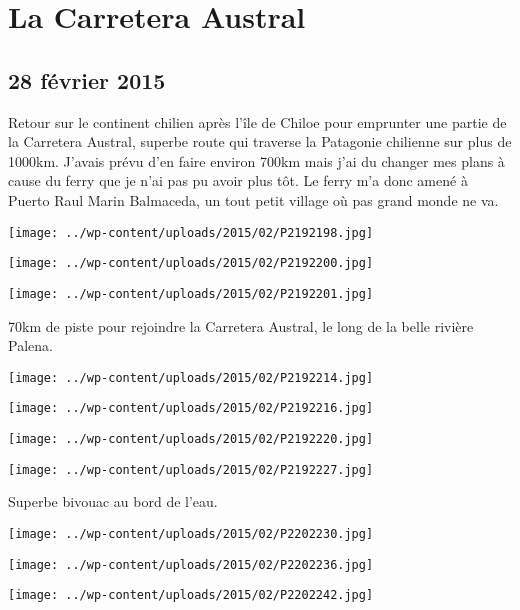 \chapter{La Carretera Austral}
\section*{28 février 2015}
Retour sur le continent chilien après l'île de Chiloe pour emprunter une partie de la Carretera Austral, superbe route qui traverse la Patagonie chilienne sur plus de 1000km. \newline
 J'avais prévu d'en faire environ 700km mais j'ai du changer mes plans à cause du ferry que je n'ai pas pu avoir plus tôt. \newline
 Le ferry m'a donc amené à Puerto Raul Marin Balmaceda, un tout petit village où pas grand monde ne va. \newline
 \newline
\centerline{\texttt{[image: ../wp-content/uploads/2015/02/P2192198.jpg]} } 
\newline
\centerline{\texttt{[image: ../wp-content/uploads/2015/02/P2192200.jpg]} } 
 \newline
\centerline{\texttt{[image: ../wp-content/uploads/2015/02/P2192201.jpg]} } 
70km de piste pour rejoindre la Carretera Austral, le long de la belle rivière Palena. \newline
 \newline
\centerline{\texttt{[image: ../wp-content/uploads/2015/02/P2192214.jpg]} } 
 \newline
\centerline{\texttt{[image: ../wp-content/uploads/2015/02/P2192216.jpg]} } 
 \newline
\centerline{\texttt{[image: ../wp-content/uploads/2015/02/P2192220.jpg]} } 
 \newline
\centerline{\texttt{[image: ../wp-content/uploads/2015/02/P2192227.jpg]} } 
 \newline
 Superbe bivouac au bord de l'eau.\newline
\centerline{\texttt{[image: ../wp-content/uploads/2015/02/P2202230.jpg]} } 
 \newline
 \newline
\centerline{\texttt{[image: ../wp-content/uploads/2015/02/P2202236.jpg]} } 
 \newline
\centerline{\texttt{[image: ../wp-content/uploads/2015/02/P2202242.jpg]} } 
